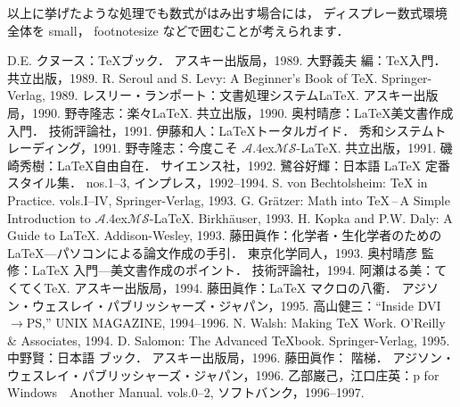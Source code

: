 \documentclass[paper]{jrsj}    %
\def\AmSLaTeX{%
 $\mathcal{A}$\lower.4ex\hbox{$\!\mathcal{M}\!$}$\mathcal{S}$-\LaTeX}
\begin{document}
\fi

以上に挙げたような処理でも数式がはみ出す場合には，
ディスプレー数式環境全体を {\ttfamily small}，
{\ttfamily footnotesize} などで囲むことが考えられます．

\begin{thebibliography}{99}
 D.E. クヌース：\TeX{}ブック．
 アスキー出版局，1989.
 大野義夫 編：\TeX{}入門．
 共立出版，1989.
 R. Seroul and S. Levy: A Beginner's Book of \TeX{}. 
 Springer-Verlag, 1989.
 レスリー・ランポート：文書処理システム\LaTeX{}. 
 アスキー出版局，1990.
 野寺隆志：楽々\LaTeX{}. 
 共立出版，1990.
 奥村晴彦：\LaTeX{}美文書作成入門．
 技術評論社，1991.
 伊藤和人：\LaTeX{}トータルガイド．
 秀和システムトレーディング，1991.
 野寺隆志：今度こそ\AmSLaTeX{}. 
 共立出版，1991.
 磯崎秀樹：\LaTeX{}自由自在．
 サイエンス社，1992.
 鷺谷好輝：日本語 \LaTeX{} 定番スタイル集．
 nos.1--3, インプレス，1992--1994.
 S. von Bechtolsheim: \TeX{} in Practice. 
 vols.\RN{1}--\RN{4}, Springer-Verlag, 1993.
 G. Gr\"{a}tzer:
 Math into \TeX{}\,--\,A Simple Introduction to \AmSLaTeX{}. 
 Birkh\"{a}user, 1993.
 H. Kopka and P.W. Daly: A Guide to \LaTeX{}. 
 Addison-Wesley, 1993.
 藤田眞作：化学者・生化学者のための\LaTeX{}---パソコンによる論文作成の手引．
 東京化学同人，1993.
 奥村晴彦 監修：\LaTeX{} 入門---美文書作成のポイント．
 技術評論社，1994.
 阿瀬はる美：てくてく\TeX{}.
 アスキー出版局，1994.
 藤田眞作：\LaTeX{} マクロの八衢．
 アジソン・ウェスレイ・パブリッシャーズ・ジャパン，1995.
 高山健三：``Inside DVI$\rightarrow$PS,'' 
 UNIX MAGAZINE, 1994--1996.
 N. Walsh: Making \TeX{} Work. 
 O'Reilly \& Associates, 1994.
 D. Salomon: The Advanced \TeX{}book. 
 Springer-Verlag, 1995.
 中野賢：日本語 \LaTeXe{} ブック．
 アスキー出版局，1996.
 藤田眞作：\LaTeXe{} 階梯．
 アジソン・ウェスレイ・パブリッシャーズ・ジャパン，1996.
\bibitem{}
 乙部巌己，江口庄英：p\LaTeXe{} for Windows\ \ Another Manual. 
 vols.0--2, ソフトバンク，1996--1997.

\end{thebibliography}
\end{document}

